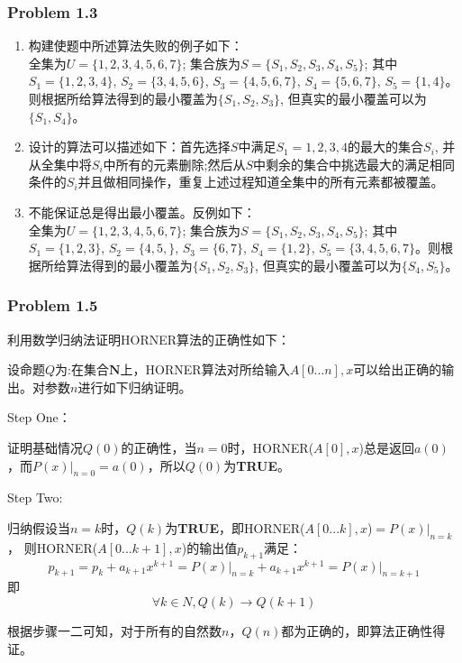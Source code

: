 \documentclass[UTF8,12pt]{article} %
\makeatletter
\theoremstyle{definition}
\newenvironment{proof}[1][\protect\proofname]{\par
\normalfont\topsep6\p@\@plus6\p@\relax
\trivlist
\itemindent\parindent
\item[\hskip\labelsep
\scshape
#1]\ignorespaces
}{%
\endtrivlist\@endpefalse
}
\renewcommand{\proofname}{\it{\textbf{证明}}}
\makeatother
\begin{document}
\subsubsection*{Problem 1.3}
\begin{proof}[\textbf{解答}]

\begin{enumerate}[1)]
	\item 构建使题中所述算法失败的例子如下： \\
	 全集为$U = \{1,2,3,4,5,6,7\}$; 集合族为$S = \{S_{1}, S_{2}, S_{3}, S_{4}, S_{5}\}$; 其中$S_{1} = \{1,2,3,4\}$, $S_{2} = \{3,4,5,6\}$, $S_{3} = \{4,5,6,7\}$, $S_{4} = \{5,6,7\}$, $S_{5} = \{1,4\}$。则根据所给算法得到的最小覆盖为$\{S_{1}, S_{2}, S_{3}\}$, 但真实的最小覆盖可以为$\{S_{1}, S_{4}\}$。

	\item 设计的算法可以描述如下：首先选择$S$中满足$S_{1} = {1,2,3,4}$的最大的集合$S_{i}$, 并从全集中将$S_{i}$中所有的元素删除;然后从$S$中剩余的集合中挑选最大的满足相同条件的$S_{i}$并且做相同操作，重复上述过程知道全集中的所有元素都被覆盖。

	\item 不能保证总是得出最小覆盖。反例如下：\\
		 全集为$U = \{1,2,3,4,5,6,7\}$; 集合族为$S = \{S_{1}, S_{2}, S_{3}, S_{4}, S_{5}\}$; 其中$S_{1} = \{1,2,3\}$, $S_{2} = \{4,5,\}$, $S_{3} = \{6,7\}$, $S_{4} = \{1,2\}$, $S_{5} = \{3,4,5,6,7\}$。则根据所给算法得到的最小覆盖为$\{S_{1}, S_{2}, S_{3}\}$, 但真实的最小覆盖可以为$\{S_{4}, S_{5}\}$。
\end{enumerate}

\end{proof}


\subsubsection*{Problem 1.5}
\begin{proof}
利用数学归纳法证明HORNER算法的正确性如下：


设命题$Q$为:在集合$\textbf{N}$上，HORNER算法对所给输入$A[0...n], x$可以给出正确的输出。对参数$n$进行如下归纳证明。

Step One：

证明基础情况$Q(0)$的正确性，当$n=0$时，HORNER($A[0], x$)总是返回$a(0)$，而$P(x)\big|_{n=0}=a(0)$，所以$Q(0)$为\textbf{TRUE}。

Step Two:

归纳假设当$n=k$时，$Q(k)$为\textbf{TRUE}，即HORNER($A[0...k], x$)$=P(x)\big|_{n=k}$，
则HORNER($A[0...k+1],x$)的输出值$p_{k+1}$满足：\[p_{k+1}= p_{k} + a_{k+1}x^{k+1} = P(x)\big|_{n=k} + a_{k+1}x^{k+1} = P(x)\big|_{n=k+1}\]即\[\forall k \in N, Q(k) \rightarrow Q(k+1)\]

根据步骤一二可知，对于所有的自然数$n$，$Q(n)$都为正确的，即算法正确性得证。
\end{proof}
\end{document}
